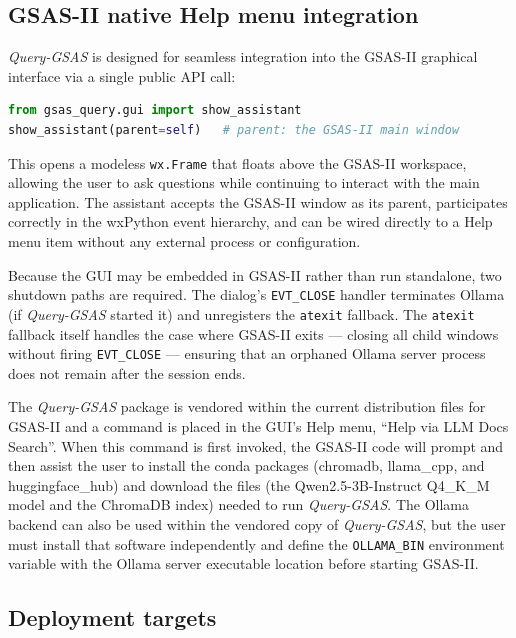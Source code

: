\subsection{GSAS-II native Help menu integration}
\label{sec:integration}

\textit{Query-GSAS} is designed for seamless integration into the GSAS-II
graphical interface via a single public API call:

\begin{lstlisting}[language=Python]
from gsas_query.gui import show_assistant
show_assistant(parent=self)   # parent: the GSAS-II main window
\end{lstlisting}

This opens a modeless \texttt{wx.Frame} that floats above the GSAS-II
workspace, allowing the user to ask questions while continuing to
interact with the main application.
The assistant accepts the GSAS-II window as its parent, participates
correctly in the wxPython event hierarchy, and can be wired directly
to a Help menu item without any external process or configuration.

Because the GUI may be embedded in GSAS-II rather than run
standalone, two shutdown paths are required.
The dialog's \texttt{EVT\_CLOSE} handler terminates Ollama (if
\textit{Query-GSAS} started it) and unregisters the \texttt{atexit} fallback.
The \texttt{atexit} fallback itself handles the case where GSAS-II
exits --- closing all child windows without firing \texttt{EVT\_CLOSE} ---
ensuring that an orphaned Ollama server process does not remain after the session ends.

The \textit{Query-GSAS} package is vendored within the current distribution files for GSAS-II and a command is placed in the GUI's Help menu, ``Help via LLM Docs Search''.  
When this command is first invoked, the GSAS-II code will prompt and then assist the user to install the conda packages (chromadb, llama\_cpp, and huggingface\_hub) and download the files (the Qwen2.5-3B-Instruct Q4\_K\_M model and the ChromaDB index) needed to run \textit{Query-GSAS}. 
The Ollama backend can also be used within the vendored copy of \textit{Query-GSAS}, but the user must install that software independently and define the \texttt{OLLAMA\_BIN} environment variable with the Ollama server executable location before starting GSAS-II. 

\subsection{Deployment targets}
\label{sec:deployment}

